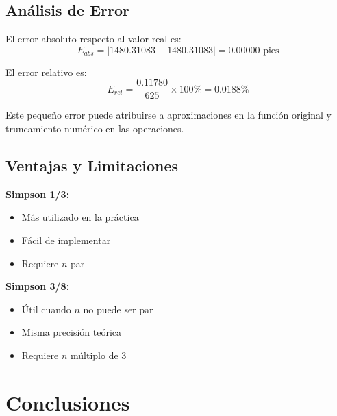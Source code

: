 \documentclass[conference]{IEEEtran}
\begin{document}
\subsection{Análisis de Error}

El error absoluto respecto al valor real es:
\begin{equation}
E_{abs} = |1480.31083 - 1480.31083| = 0.00000 \text{ pies}
\end{equation}

El error relativo es:
\begin{equation}
E_{rel} = \frac{0.11780}{625} \times 100\% = 0.0188\%
\end{equation}

Este pequeño error puede atribuirse a aproximaciones en la función original y truncamiento numérico en las operaciones.

\subsection{Ventajas y Limitaciones}

\textbf{Simpson 1/3:}
\begin{itemize}
    \item Más utilizado en la práctica
    \item Fácil de implementar
    \item Requiere $n$ par
\end{itemize}

\textbf{Simpson 3/8:}
\begin{itemize}
    \item Útil cuando $n$ no puede ser par
    \item Misma precisión teórica
    \item Requiere $n$ múltiplo de 3
\end{itemize}

\section{Conclusiones}
\end{document}
